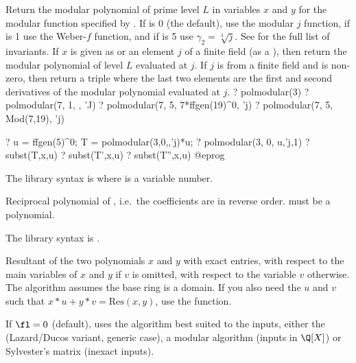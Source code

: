 \label{se:polmodular}
Return the modular polynomial of prime level $L$ in variables $x$ and $y$
for the modular function specified by .  If  is 0 (the
default), use the modular $j$ function, if  is 1 use the
Weber-$f$ function, and if  is 5 use $\gamma_2 =
\sqrt[3]{j}$.
See  for the full list of invariants.
If $x$ is given as  or an element $j$ of
a finite field (as a ), then return the modular polynomial of
level $L$ evaluated at $j$.  If $j$ is from a finite field and
 is non-zero, then return a triple where the
last two elements are the first and second derivatives of the modular
polynomial evaluated at $j$.
\bprog
? polmodular(3)
? polmodular(7, 1, , 'J)
? polmodular(7, 5, 7*ffgen(19)^0, 'j)
? polmodular(7, 5, Mod(7,19), 'j)

? u = ffgen(5)^0; T = polmodular(3,0,,'j)*u;
? polmodular(3, 0, u,'j,1)
? subst(T,x,u)
? subst(T',x,u)
? subst(T'',x,u)
@eprog

The library syntax is  where  is a variable number.

\label{se:polrecip}
Reciprocal polynomial of , i.e.~the coefficients are in
reverse order.  must be a polynomial.

The library syntax is .

\label{se:polresultant}
Resultant of the two
polynomials $x$ and $y$ with exact entries, with respect to the main
variables of $x$ and $y$ if $v$ is omitted, with respect to the variable $v$
otherwise. The algorithm assumes the base ring is a domain. If you also need
the $u$ and $v$ such that $x*u + y*v = \text{Res}(x,y)$, use the
 function.

If $\fl=0$ (default), uses the algorithm best suited to the inputs,
either the  (Lazard/Ducos variant, generic case),
a modular algorithm (inputs in $\Q[X]$) or Sylvester's matrix (inexact
inputs).

